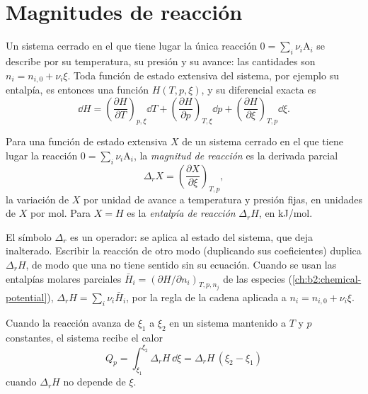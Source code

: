\section{Magnitudes de reacción}

Un sistema cerrado en el que tiene lugar la única reacción $0 = \sum_i\nu_i\mathrm A_i$
se describe por su temperatura, su presión y su avance:
las cantidades son $n_i = n_{i,0} + \nu_i\xi$. Toda función de estado extensiva
del sistema, por ejemplo su entalpía, es entonces una función $H(T, p,
\xi)$, y su diferencial exacta es
\[
  \dd H = \left(\frac{\partial H}{\partial T}\right)_{p,\xi}\dd T
        + \left(\frac{\partial H}{\partial p}\right)_{T,\xi}\dd p
        + \left(\frac{\partial H}{\partial \xi}\right)_{T,p}\dd\xi .
\]

\begin{definition}\label{def:b2:reaction-enthalpy:reaction-quantity}
Para una función de estado extensiva $X$ de un sistema cerrado en el que
tiene lugar la reacción $0 = \sum_i\nu_i\mathrm A_i$, la \emph{magnitud de
reacción} es la derivada parcial
\[
  \Delta_r X = \left(\frac{\partial X}{\partial \xi}\right)_{T,p} ,
\]
la variación de $X$ por unidad de avance a temperatura y presión fijas, en
unidades de $X$ por mol. Para $X = H$ es la \emph{entalpía de
reacción} $\Delta_r H$, en \unit{kJ/mol}.
\end{definition}

\begin{remark}\label{rem:b2:reaction-enthalpy:operator}
El símbolo $\Delta_r$ es un operador: se aplica al estado del
sistema, que deja inalterado. Escribir la reacción de otro modo
(duplicando sus coeficientes) duplica $\Delta_r H$, de modo que una  no
tiene sentido sin su ecuación. Cuando se usan las entalpías molares parciales
$\bar H_i = (\partial H/\partial n_i)_{T,p,n_j}$ de las especies
(\cref{ch:b2:chemical-potential}), $\Delta_r H = \sum_i\nu_i\bar H_i$, por
la regla de la cadena aplicada a $n_i = n_{i,0} + \nu_i\xi$.
\end{remark}

\begin{proposition}\label{prop:b2:reaction-enthalpy:qp}
Cuando la reacción avanza de $\xi_1$ a $\xi_2$ en un sistema mantenido a
$T$ y $p$ constantes, el sistema recibe el calor
\[
  Q_p = \int_{\xi_1}^{\xi_2}\Delta_r H\,\dd\xi = \Delta_r H\,(\xi_2 - \xi_1)
\]
cuando $\Delta_r H$ no depende de $\xi$.
\end{proposition}

